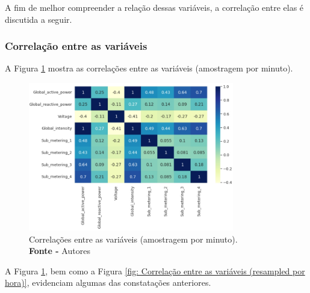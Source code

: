 A fim de melhor compreender a relação dessas variáveis, a correlação entre elas é discutida a seguir.

\subsubsection{Correlação entre as variáveis}

A Figura \ref{fig: Correlaçao entre as variáveis (amostragem por minuto)} mostra as correlações entre as variáveis (amostragem por minuto).
\begin{figure}[H]
    \centering
    \includegraphics[width=0.80\textwidth]{Figuras/4. Resultados e Discussões/Exer4/Correlaçao entre as variáveis (amostragem por minuto).jpg}
    \caption{Correlações entre as variáveis (amostragem por minuto).\\ \textbf{Fonte -} Autores}
    \label{fig: Correlaçao entre as variáveis (amostragem por minuto)}
\end{figure}

A Figura \ref{fig: Correlaçao entre as variáveis (amostragem por minuto)}, bem como a Figura \ref{fig: Correlação entre as variáveis (resampled por hora)}, evidenciam algumas das constatações anteriores.

